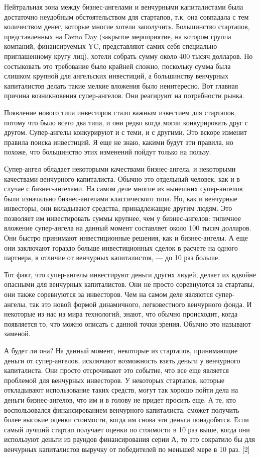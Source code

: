 \documentclass[ebook,12pt,oneside,openany]{memoir}
\begin{document}
Нейтральная зона между бизнес-ангелами и венчурными капиталистами была
достаточно неудобным обстоятельством для стартапов, т.к. она совпадала
с тем количеством денег, которые многие хотели заполучить. Большинство
стартапов, представленных на Demo Day (закрытое мероприятие, на
котором группа компаний, финансируемых YC, представляют самих себя
специально приглашенному кругу лиц), хотели собрать сумму около 400
тысяч долларов. Но состыковать это требование было крайней сложно,
поскольку сумма была слишком крупной для ангельских инвестиций, а
большинству венчурных капиталистов делать такие мелкие вложения было
неинтересно. Вот главная причина возникновения супер-ангелов. Они
реагируют на потребности рынка.

Появление нового типа инвесторов стало важным известием для стартапов,
потому что было всего два типа, и они редко когда могли конкурировать
друг с другом. Супер-ангелы конкурируют и с теми, и с другими. Это
вскоре изменит правила поиска инвестиций. Я еще не знаю, какими будут
эти правила, но похоже, что большинство этих изменений пойдут только
на пользу.

Супер-ангел обладает некоторыми качествами бизнес-ангела, и некоторыми
качествами венчурного капиталиста. Обычно это отдельный человек, как и
в случае с бизнес-ангелами. На самом деле многие из нынешних
супер-ангелов были изначально бизнес-ангелами классического типа. Но,
как и венчурные инвесторы, они вкладывают средства, принадлежащие
другим людям. Это позволяет им инвестировать суммы крупнее, чем у
бизнес-ангелов: типичное вложение супер-ангела на данный момент
составляет около 100 тысяч долларов. Они быстро принимают
инвестиционные решения, как и бизнес-ангелы. А еще они заключают
гораздо больше инвестиционных сделок в расчете на одного партнера, в
отличие от венчурных капиталистов, — до 10 раз больше.

Тот факт, что супер-ангелы инвестируют деньги других людей, делает их
вдвойне опасными для венчурных капиталистов. Они не просто соревнуются
за стартапы, они также соревнуются за инвесторов. Чем на самом деле
являются супер-ангелы, так это новой формой динамичного, легковестного
венчурного фонда. И некоторые из нас из мира технологий, знают, что
обычно происходит, когда появляется то, что можно описать с данной
точки зрения. Обычно это называют заменой.

А будет ли она? На данный момент, некоторые из стартапов, принимающие
деньги от супер-ангелов, исключают возможность взять деньги у
венчурного капиталиста. Они просто отсрочивают это событие, что все
еще является проблемой для венчурных инвесторов. У некоторых
стартапов, которые откладывают использование таких средств, могут так
хорошо пойти дела на деньги бизнес-ангелов, что им и в голову не
придет просить еще. А те, кто воспользовался финансированием
венчурного капиталиста, сможет получить более высокие оценки
стоимости, когда им снова эти деньги понадобятся. Если самый лучший
стартап получает оценки по стоимости в 10 раз выше, когда они
используют деньги из раундов финансирования серии А, то это сократило
бы для венчурных капиталистов выручку от победителей по меньшей мере в
10 раз. [2]
\end{document}
